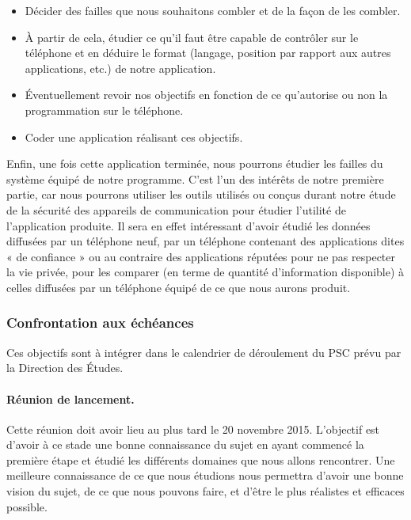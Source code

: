 \documentclass[a4paper, 12pt,twoside]{article}
\begin{document}
		\begin{itemize}\setlength{\parskip}{0pt}
			\item Décider des failles que nous souhaitons combler et de la façon de les combler.
			\item À partir de cela, étudier ce qu'il faut être capable de contrôler sur le téléphone et en déduire le format (langage, position par rapport aux autres applications, etc.) de notre application.
			\item Éventuellement revoir nos objectifs en fonction de ce qu'autorise ou non la programmation sur le téléphone.
			\item Coder une application réalisant ces objectifs.
		\end{itemize}
		
		Enfin, une fois cette application terminée, nous pourrons étudier les failles du système équipé de notre programme. C'est l'un des intérêts de notre première partie, car nous pourrons utiliser les outils utilisés ou conçus durant notre étude de la sécurité des appareils de communication pour étudier l'utilité de l'application produite. Il sera en effet intéressant d'avoir étudié les données diffusées par un téléphone neuf, par un téléphone contenant des applications dites « de confiance » ou au contraire des applications réputées pour ne pas respecter la vie privée, pour les comparer (en terme de quantité d'information disponible) à celles diffusées par un téléphone équipé de ce que nous aurons produit.
		
		\subsubsection{Confrontation aux échéances}
		
		Ces objectifs sont à intégrer dans le calendrier de déroulement du PSC prévu par la Direction des Études.
		
		\paragraph{Réunion de lancement. } Cette réunion doit avoir lieu au plus tard le 20 novembre 2015. L'objectif est d'avoir à ce stade une bonne connaissance du sujet en ayant commencé la première étape et étudié les différents domaines que nous allons rencontrer. Une meilleure connaissance de ce que nous étudions nous permettra d'avoir une bonne vision du sujet, de ce que nous pouvons faire, et d'être le plus réalistes et efficaces possible.
		
\end{document}
